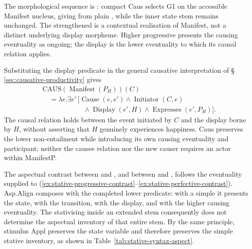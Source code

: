 The morphological sequence is : compact Caus
 selects G1 on the accessible Manifest nucleus, giving
 from plain , while the inner state stem remains
unchanged. The strengthened  is a contextual realisation of
Manifest, not a distinct underlying display morpheme. Higher progressive
 presents the causing eventuality as ongoing; the display is
the lower eventuality to which its causal relation applies.

Substituting the display predicate in the general causative interpretation
of §\,\ref{sec:causative-productivity} gives
\[
\begin{aligned}
 &\mathrm{CAUS}(\operatorname{Manifest}(P_H))(C)\\
 &\quad=\lambda e.\exists e'\,[\operatorname{Cause}(e,e')
   \land\operatorname{Initiator}(C,e)\\
 &\hspace{6em}\land\operatorname{Display}(e',H)
   \land\operatorname{Expresses}(e',P_H)].
\end{aligned}
\]
The causal relation holds between the event initiated by $C$ and the display
borne by $H$, without asserting that $H$ genuinely experiences happiness. Caus
preserves the lower non-entailment while introducing its own causing
eventuality and participant; neither the causee relation nor the new causer
requires an actor within ManifestP.

The aspectual contrast between  and
, and between  and
, follows the eventuality supplied to
 (\ref{ex:stative-progressive-contrast}--\ref{ex:stative-perfective-contrast}).
Asp.Align composes with the completed lower predicate: with a simple
 it presents the state, with  the
transition, with  the display, and with 
the higher causing eventuality. The stativising  inside an
extended stem consequently does not determine the aspectual inventory of
that entire stem. By the same principle, stimulus Appl preserves the state
variable and therefore preserves the simple stative inventory, as shown in
Table~\ref{tab:stative-syntax-aspect}.

